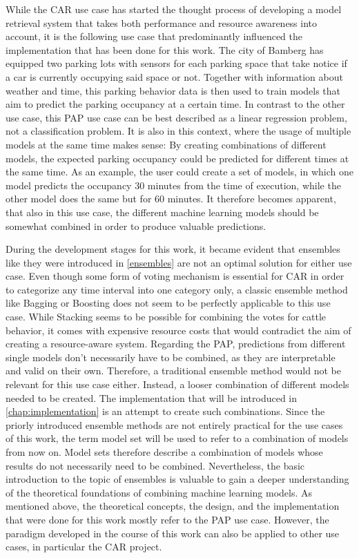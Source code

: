 While the CAR use case has started the thought process of developing a model retrieval system that takes both performance and resource awareness into account, it is the following use case that predominantly influenced the implementation that has been done for this work. The city of Bamberg has equipped two parking lots with sensors for each parking space that take notice if a car is currently occupying said space or not. Together with information about weather and time, this parking behavior data is then used to train models that aim to predict the parking occupancy at a certain time. In contrast to the other use case, this PAP use case can be best described as a linear regression problem, not a classification problem. It is also in this context, where the usage of multiple models at the same time makes sense: By creating combinations of different models, the expected parking occupancy could be predicted for different times at the same time. As an example, the user could create a set of models, in which one model predicts the occupancy 30 minutes from the time of execution, while the other model does the same but for 60 minutes. It therefore becomes apparent, that also in this use case, the different machine learning models should be somewhat combined in order to produce valuable predictions. 

During the development stages for this work, it became evident that ensembles like they were introduced in \autoref{ensembles} are not an optimal solution for either use case. Even though some form of voting mechanism is essential for CAR in order to categorize any time interval into one category only, a classic ensemble method like Bagging or Boosting does not seem to be perfectly applicable to this use case. While Stacking seems to be possible for combining the votes for cattle behavior, it comes with expensive resource costs that would contradict the aim of creating a resource-aware system. Regarding the PAP, predictions from different single models don’t necessarily have to be combined, as they are interpretable and valid on their own. Therefore, a traditional ensemble method would not be relevant for this use case either. Instead, a looser combination of different models needed to be created. The implementation that will be introduced in \autoref{chap:implementation} is an attempt to create such combinations. Since the priorly introduced ensemble methods are not entirely practical for the use cases of this work, the term model set will be used to refer to a combination of models from now on. Model sets therefore describe a combination of models whose results do not necessarily need to be combined. Nevertheless, the basic introduction to the topic of ensembles is valuable to gain a deeper understanding of the theoretical foundations of combining machine learning models. As mentioned above, the theoretical concepts, the design, and the implementation that were done for this work mostly refer to the PAP use case. However, the paradigm developed in the course of this work can also be applied to other use cases, in particular the CAR project. 


